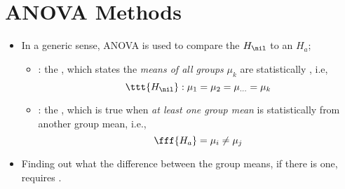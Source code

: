 \section{ANOVA Methods}
\begin{itemize}
  \item In a generic sense, ANOVA is used to compare the \(H_\nil\) to an \(H_a\);
    \begin{itemize}
      \item {}: the , which states the \emph{means of all groups} \(\mu_k\) are statistically , i.e,
      \[%
      \ttt{H_\nil} : \mu_1 = \mu_2 = \mu_{\ldots} = \mu_k
      \]%
      \item {}: the , which is true when \emph{at least one group mean} is statistically  from another group mean, i.e.,
      \[%
      \fff{H_a} = \mu_i \neq \mu_j
      \]%
    \end{itemize}
  \item Finding out what the difference between the group means, if there is one, requires \hyperref[Subsection: Post Hoc Comparisons]{}.


\end{itemize}
